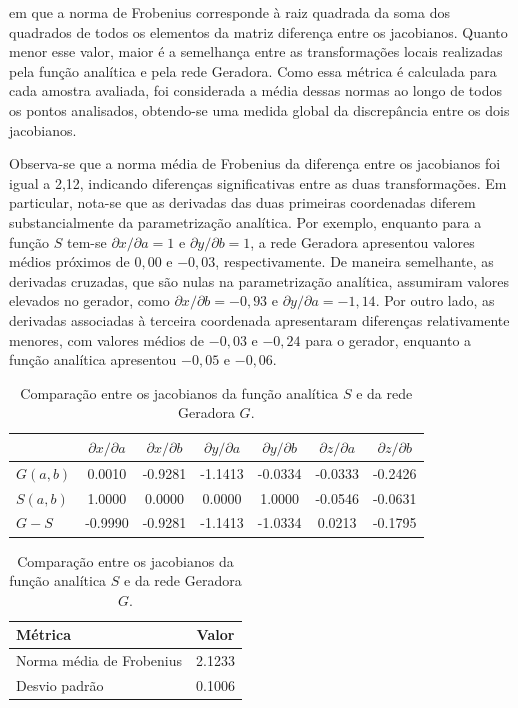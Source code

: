 \documentclass[10pt,a4paper]{article}
\begin{document}
em que a norma de Frobenius corresponde à raiz quadrada da soma dos quadrados de todos os elementos da matriz diferença entre os jacobianos. Quanto menor esse valor, maior é a semelhança entre as transformações locais realizadas pela função analítica e pela rede Geradora. Como essa métrica é calculada para cada amostra avaliada, foi considerada a média dessas normas ao longo de todos os pontos analisados, obtendo-se uma medida global da discrepância entre os dois jacobianos.

Observa-se que a norma média de Frobenius da diferença entre os jacobianos foi igual a 2,12, indicando diferenças significativas entre as duas transformações. Em particular, nota-se que as derivadas das duas primeiras coordenadas diferem substancialmente da parametrização analítica. Por exemplo, enquanto para a função $S$ tem-se $\partial x/\partial a = 1$ e $\partial y/\partial b = 1$, a rede Geradora apresentou valores médios próximos de $0,00$ e $-0,03$, respectivamente. De maneira semelhante, as derivadas cruzadas, que são nulas na parametrização analítica, assumiram valores elevados no gerador, como $\partial x/\partial b=-0,93$ e $\partial y/\partial a=-1,14$. Por outro lado, as derivadas associadas à terceira coordenada apresentaram diferenças relativamente menores, com valores médios de $-0,03$ e $-0,24$ para o gerador, enquanto a função analítica apresentou $-0,05$ e $-0,06$.

\begin{table}[H]
\centering
\caption{Comparação entre os jacobianos da função analítica $S$ e da rede Geradora $G$.}
\label{tab:res_grad1}

\begin{tabular}{lcccccc}
\toprule
 & $\partial x/\partial a$ & $\partial x/\partial b$ & $\partial y/\partial a$ & $\partial y/\partial b$ & $\partial z/\partial a$ & $\partial z/\partial b$ \\
\midrule
$G(a,b)$ & 0.0010 & -0.9281 & -1.1413 & -0.0334 & -0.0333 & -0.2426 \\
$S(a,b)$ & 1.0000 & 0.0000 & 0.0000 & 1.0000 & -0.0546 & -0.0631 \\
$G-S$    & -0.9990 & -0.9281 & -1.1413 & -1.0334 & 0.0213 & -0.1795 \\
\bottomrule
\end{tabular}

\vspace{0.3cm}

\begin{tabular}{lc}
\toprule
Métrica & Valor \\
\midrule
Norma média de Frobenius & 2.1233 \\
Desvio padrão & 0.1006 \\
\bottomrule
\end{tabular}

\end{table}
\end{document}
